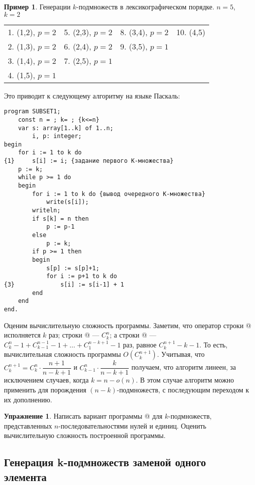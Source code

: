 \documentclass[12pt,a4paper]{article}
\theoremstyle{plain}
\theoremstyle{definition}
\newtheorem*{task}{Упражнение}
\newtheorem*{example}{Пример}
\theoremstyle{remark}
\begin{document}
\begin{example}
Генерации $k$-подмножеств в лексикографическом порядке. $n=5$, $k=2$

\begin{tabular}{cccc}
1. (1,2), $p=2$ & 5. (2,3), $p=2$ & 8. (3,4), $p=2$ & 10. (4,5) \\
2. (1,3), $p=2$ & 6. (2,4), $p=2$ & 9. (3,5), $p=1$ \\
3. (1,4), $p=2$ & 7. (2,5), $p=1$ \\
4. (1,5), $p=1$
\end{tabular}
\end{example}

Это приводит к следующему алгоритму на языке Паскаль:

\begin{verbatim}
program SUBSET1;
    const n = ; k= ; {k<=n}
    var s: array[1..k] of 1..n;
        i, p: integer;
begin
    for i := 1 to k do
{1}     s[i] := i; {задание первого K-множества}
    p := k;
    while p >= 1 do
    begin
        for i := 1 to k do {вывод очередного K-множества}
            write(s[i]);
        writeln;
        if s[k] = n then
            p := p-1
        else
            p := k;
        if p >= 1 then
        begin
            s[p] := s[p]+1;
            for i := p+1 to k do
{3}             s[i] := s[i-1] + 1
        end
    end
end.
\end{verbatim}

Оценим вычислительную сложность программы. Заметим, что оператор строки @ исполняется $k$ раз; строки @ --- $C_k^n$; а строки @ --- $C_k^n - 1 + C_{k-1}^{n-1}-1 + \ldots + C_1^{n-k+1}-1$ раз, равное $C_k^{n+1} - k - 1$. То есть, вычислительная сложность программы $O(C_k^{n+1})$. Учитывая, что $C_k^{n+1} = C_k^n \cdot \dfrac{n+1}{n-k+1}$ и $C_{k-1}^n \cdot \dfrac{k}{n-k+1}$ получаем, что алгоритм линеен, за исключением случаев, когда $k=n-o(n)$. В этом случае алгоритм можно применить для порождения $(n-k)$-подмножеств, с последующим переходом к их дополнению.

\begin{task}
Написать вариант программы @ для $k$-подмножеств, представленных $n$-последовательностями нулей и единиц. Оценить вычислительную сложность построенной программы.
\end{task}

\subsection{Генерация k-подмножеств заменой одного элемента}
\end{document}
